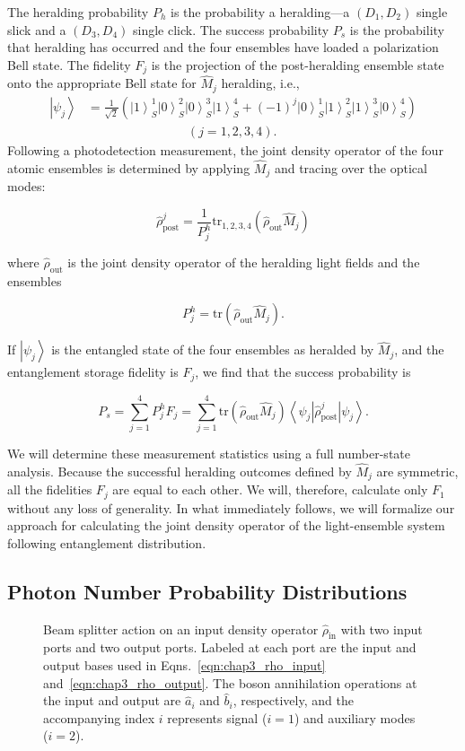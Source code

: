 \documentclass[aps,twocolumn,secnumarabic,amsmath,amssymb,pra,groupedaddress,
showpacs, showkeys]{revtex4-1}
\newcommand{\bra}[1]{\left\langle #1 \right|}
\newcommand{\ket}[1]{\left|#1\right\rangle}
\newcommand{\pna}[1]{\left(#1\right)}
\newcommand{\eqn}[1]{
\begin{equation}
	#1
\end{equation}
}
\begin{document}
The heralding probability $P_{h}$ is the probability a
heralding---a $\pna{D_1, D_2}$ single slick and a $\pna{D_3, D_4}$ single
click. The success probability $P_{s}$ is the probability that
heralding has occurred and the four ensembles have loaded a polarization Bell
state. The fidelity $F_j$ is the projection of the post-heralding ensemble
state onto the appropriate Bell state for $\hat{M}_j$ heralding, i.e.,
\begin{align}
\ket{\psi_j} & 
=
\frac{1}{\sqrt{2}}\pna{\ket{1}_S^1\ket{0}_S^2\ket{0}_S^3\ket{1}_S^4+\pna{-1}^j
  \ket{0}_S^1\ket{1}_S^2\ket{1}_S^3\ket{0}_S^4} \nonumber \\ & \qquad \qquad
\qquad \qquad \pna{j=1,2,3,4}.\label{eqn:remaining_singlet}
\end{align}
Following a photodetection measurement, the joint density operator of the four
atomic ensembles is determined by applying $\hat{M}_j$ and tracing over the
optical modes:
	\eqn{
	\hat{\rho}_{\textrm{post}}^j=\frac{1}{P_j^{h}}\textrm{tr}_{1,2,3,4}\pna{\hat{\rho}_{\textrm{out}}\hat{M}_j}
	}
	where $\hat{\rho}_{\textrm{out}}$ is the joint density operator of the heralding light fields and the ensembles 
	\eqn{
	P_j^{h}=\textrm{tr}\pna{\hat{\rho}_{\textrm{out}}\hat{M}_j} \label{eqn:herald_prob}.
}
If $\ket{\psi_j}$ is the entangled state of the four ensembles as heralded by
$\hat{M}_j$, and the entanglement storage fidelity is $F_j$, we find that the
success probability is
\eqn{
P_{s} = \sum_{j=1}^4 P_j^{h} F_j =\sum_{j=1}^{4} \textrm{tr}\pna{\hat{\rho}_{\textrm{out}}\hat{M}_j} \bra{\psi_j} \hat{\rho}_{\textrm{post}}^j \ket{\psi_j}.\label{eq:success_prob_def}  
}
We will determine these measurement statistics using a full number-state
analysis. Because the successful heralding outcomes defined by $\hat{M}_j$ are
symmetric, all the fidelities $F_j$ are equal to each other. We will,
therefore, calculate only $F_1$ without any loss of generality.  In what
immediately follows, we will formalize our approach for calculating the joint
density operator of the light-ensemble system following entanglement
distribution.

\subsection{Photon Number Probability Distributions}

\begin{figure}[tb]
	\centering
	\resizebox{3.00in}{!}{}
	\caption{Beam splitter action on an input density operator $\hat{\rho}_{\textrm{in}}$ with two input ports and two output ports. Labeled at each port are the input and output bases used in Eqns.~\ref{eqn:chap3_rho_input} and~\ref{eqn:chap3_rho_output}. The boson annihilation operations at the input and output are $\hat{a}_i$ and $\hat{b}_i$, respectively, and the accompanying index $i$ represents signal ($i=1$) and auxiliary modes ($i=2$).}
	\label{fig:beamsplitter_model}
\end{figure}
\end{document}
